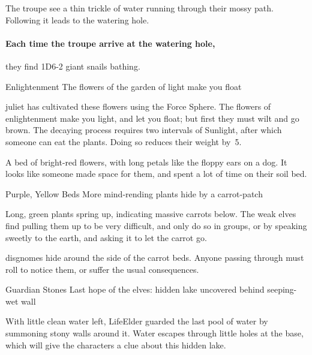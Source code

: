 \begin{multicols}{2}
The troupe see a thin trickle of water running through their mossy path.
Following it leads to the watering hole.

\paragraph{Each time the troupe arrive at the watering hole,}
they find 1D6-2 giant snails bathing.

{Enlightenment}%
{The flowers of the garden of light make you float}%


\Gls{juliet} has cultivated these flowers using the Force Sphere.
The flowers of enlightenment make you light, and let you float; but first they must wilt and go brown.
The decaying process requires two \glspl{interval} of Sunlight, after which someone can eat the plants.
Doing so reduces their \gls{weight} by~5.

\begin{boxtext}
  A bed of bright-red flowers, with long petals like the floppy ears on a dog.
  It looks like someone made space for them, and spent a lot of time on their soil bed.
\end{boxtext}

{Purple, Yellow Beds}%
{More mind-rending plants hide by a carrot-patch}%

Long, green plants spring up, indicating massive carrots below.
The weak elves find pulling them up to be very difficult, and only do so in groups, or by speaking sweetly to the earth, and asking it to let the carrot go.

\Glspl{disgnome} hide around the side of the carrot beds.
Anyone passing through must roll to notice them, or suffer the usual consequences.

{Guardian Stones}%
{Last hope of the elves: hidden lake uncovered behind seeping-wet wall}%


With little clean water left, \gls{LifeElder} guarded the last pool of water by summoning stony walls around it.
Water escapes through little holes at the base, which will give the characters a clue about this hidden lake.


\end{multicols}
